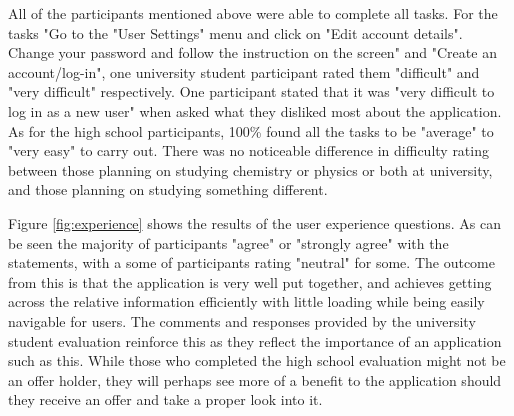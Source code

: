 \documentclass{l4proj}
\begin{document}
All of the participants mentioned above were able to complete all tasks. For the tasks "Go to the "User Settings" menu and click on "Edit account details". Change your password and follow the instruction on the screen" and "Create an account/log-in",  one university student participant rated them "difficult" and "very difficult" respectively. One participant stated that it was "very difficult to log in as a new user" when asked what they disliked most about the application. As for the high school participants, 100\% found all the tasks to be "average" to "very easy" to carry out. There was no noticeable difference in difficulty rating between those planning on studying chemistry or physics or both at university, and those planning on studying something different.

Figure \ref{fig:experience} shows the results of the user experience questions. As can be seen the majority of participants "agree" or "strongly agree" with the statements,  with a some of participants rating "neutral" for some. The outcome from this is that the application is very well put together,  and achieves getting across the relative information efficiently with little loading while being easily navigable for users. The comments and responses provided by the university student evaluation reinforce this as they reflect the importance of an application such as this. While those who completed the high school evaluation might not be an offer holder, they will perhaps see more of a benefit to the application should they receive an offer and take a proper look into it.
\end{document}
